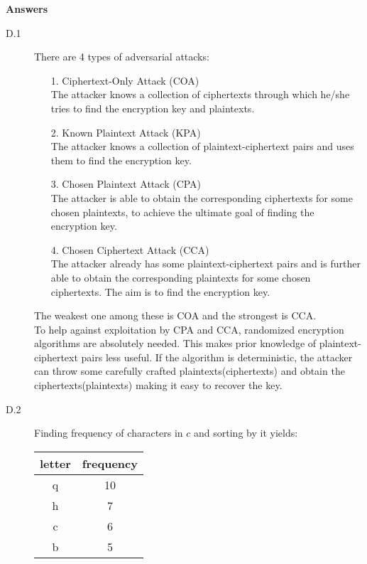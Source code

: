 \documentclass{article}
\begin{document}
\begin{description}[leftmargin=*]
	\begin{framed}
		{\bf Answers}
		\begin{description}
			\item[D.1] There are 4 types of adversarial attacks:
			\begin{itemize}
				\item[1.] Ciphertext-Only Attack (COA)\\
				The attacker knows a collection of ciphertexts through which he/she tries to find the encryption key and plaintexts.
				\item[2.] Known Plaintext Attack (KPA) \\
				The attacker knows a collection of plaintext-ciphertext pairs and uses them to find the encryption key.
				\item[3.] Chosen Plaintext Attack (CPA) \\
				The attacker is able to obtain the corresponding ciphertexts for some chosen plaintexts, to achieve the ultimate goal of finding the encryption key.
				\item[4.] Chosen Ciphertext Attack (CCA) \\
				The attacker already has some plaintext-ciphertext pairs and is further able to obtain the corresponding plaintexts for some chosen ciphertexts. The aim is to find the encryption key.
			\end{itemize}
			{\color{blue}The weakest one among these is COA and the strongest is CCA.}\\
			To help against exploitation by CPA and CCA, randomized encryption algorithms are absolutely needed. This makes prior knowledge of plaintext-ciphertext pairs less useful. If the algorithm is deterministic, the attacker can throw some carefully crafted plaintexts(ciphertexts) and obtain the ciphertexts(plaintexts) making it easy to recover the key.
			\newpage
			\item[D.2] Finding frequency of characters in $c$ and sorting by it yields:\\
			\begin{center}
				\begin{tabular}{|c | c|}
					\hline
					letter & frequency \\
					\hline
					q & 10\\
					\hline
					h & 7\\
					\hline
					c & 6\\
					\hline
					b & 5\\
					\hline

\end{tabular}
\end{center}
\end{description}
\end{framed}
\end{description}
\end{document}
